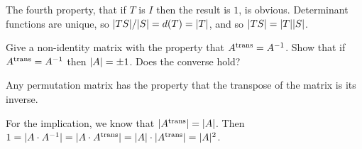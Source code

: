 \begin{exercises}
\begin{answer}
\begin{exparts}
          The fourth property, that if $T$ is $I$ then the result is $1$, 
          is obvious.
        \partsitem Determinant functions are unique, so
          \( \deter{TS}/\deter{S}=d(T)=\deter{T} \),
          and so $\deter{TS}=\deter{T}\deter{S}$.
      \end{exparts}
    \end{answer}
  \item 
    Give a non-identity matrix with the property that
    \( {{A}^{\rm trans}}=A^{-1} \).
    Show that if \( {{A}^{\rm trans}}=A^{-1} \) then \( \deter{A}=\pm 1 \).
    Does the converse hold?
    \begin{answer}
      Any permutation matrix has the property that the transpose of the
      matrix is its inverse.

      For the implication, we know that \( \deter{\trans{A}}=\deter{A} \).
      Then \( 1=\deter{A\cdot A^{-1}}=\deter{A\cdot\trans{A}}
               =\deter{A}\cdot\deter{\trans{A}}=\deter{A}^2 \).


\end{answer}
\end{exercises}
